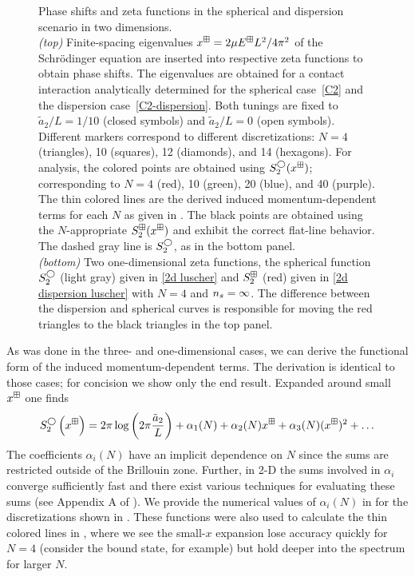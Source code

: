 \begin{figure}
    \center
    
    \caption{
    	Phase shifts and zeta functions in the spherical and dispersion scenario in two dimensions.
		\\
		\textit{(top)}
        	Finite-spacing eigenvalues $x^\boxplus=2\mu E^\boxplus L^2/4\pi^2$ of the Schr\"odinger equation are inserted into respective zeta functions to obtain phase shifts.
			The eigenvalues are obtained for a contact interaction analytically determined for the spherical case~\eqref{C2} and the dispersion case~\eqref{C2-dispersion}.
			Both tunings are fixed to $\tilde a_{2}/L=1/10$ (closed symbols) and $\tilde a_{2}/L=0$ (open symbols).
			Different markers correspond to different discretizations: $N=4$ (triangles), 10 (squares), 12 (diamonds), and 14 (hexagons).
        	For analysis, the colored points are obtained using $S^\bigcirc_2(x^\boxplus)$; corresponding to $N=4$ (red), 10 (green), 20 (blue), and 40 (purple).
        	The thin colored lines are the derived induced momentum-dependent terms for each $N$ as given in .
        	The black points are obtained using the $N$-appropriate $S^{\boxplus}_2(x^\boxplus)$ and exhibit the correct flat-line behavior.
        	The dashed gray line is $S_2^\bigcirc$, as in the bottom panel.
        \\
        \textit{(bottom)}
        	Two one-dimensional zeta functions, the spherical function $S_2^{\bigcirc}$ (light gray) given in \eqref{2d luscher} and $S_2^{\boxplus}$ (red) given in \eqref{2d dispersion luscher} with $N=4$ and ${n_s}=\infty$.
        	The difference between the dispersion and spherical curves is responsible for moving the red triangles to the black triangles in the top panel.
	}
    \label{fig:luescher2d}
\end{figure}

As was done in the three- and one-dimensional cases, we can derive the functional form of the induced momentum-dependent terms.
The derivation is identical to those cases; for concision we show only the end result.
Expanded around small $x^\boxplus$ one finds
\begin{equation}
    \label{eq:2D corrections}
    S^\bigcirc_{2}\left(x^\boxplus\right)
    =
    2\pi\log\left(2\pi \frac{\tilde a_{2}}{L}\right)
    + \alpha_1(N)
    + \alpha_2(N) x^\boxplus
    + \alpha_3(N) (x^\boxplus)^2
    + \ldots
\end{equation}
The coefficients $\alpha_i(N)$ have an implicit dependence on $N$ since the sums are restricted outside of the Brillouin zone.  Further, in 2-D the sums involved in $\alpha_i$ converge sufficiently fast and there exist various techniques for evaluating these sums (see Appendix A of ).
We provide the numerical values of $\alpha_i(N)$ in  for the discretizations shown in .
These functions were also used to calculate the thin colored lines in , where we see the small-$x$ expansion lose accuracy quickly for $N=4$ (consider the bound state, for example) but hold deeper into the spectrum for larger $N$.


